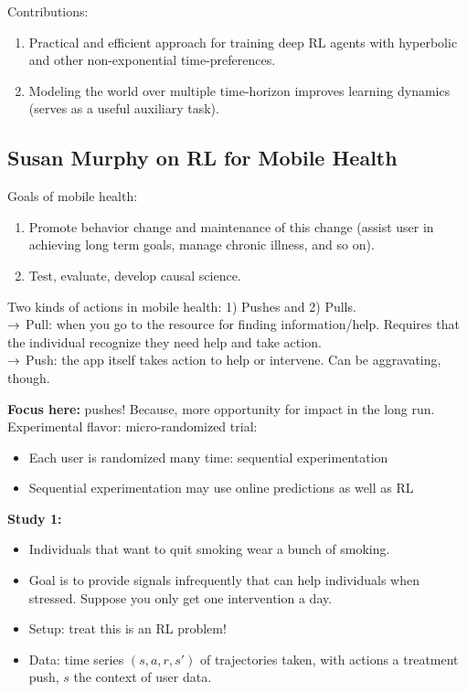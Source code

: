 Contributions:
\begin{enumerate}
    \item Practical and efficient approach for training deep RL agents with hyperbolic and other non-exponential time-preferences.
    
    \item Modeling the world over multiple time-horizon improves learning dynamics (serves as a useful auxiliary task).
\end{enumerate}
 
 \spacerule
 
 \subsection{Susan Murphy on RL for Mobile Health}

Goals of mobile health:
\begin{enumerate}
    \item Promote behavior change and maintenance of this change (assist user in achieving long term goals, manage chronic illness, and so on).
    \item Test, evaluate, develop causal science.
\end{enumerate}

Two kinds of actions in mobile health: 1) Pushes and 2) Pulls. \\

$\rightarrow$ Pull: when you go to the resource for finding information/help.  Requires that the individual recognize they need help and take action. \\

$\rightarrow$ Push: the app itself takes action to help or intervene. Can be aggravating, though.

{\bf Focus here:} pushes! Because, more opportunity for impact in the long run. \\

Experimental flavor: micro-randomized trial:
\begin{itemize}
    \item Each user is randomized many time: sequential experimentation
    \item Sequential experimentation may use online predictions as well as RL
\end{itemize}


{\bf Study 1:}
\begin{itemize}
    \item Individuals that want to quit smoking wear a bunch of smoking.
    \item Goal is to provide signals infrequently that can help individuals when stressed. Suppose you only get one intervention a day.
    \item Setup: treat this is an RL problem!
    \item Data: time series $(s,a,r,s')$ of trajectories taken, with actions a treatment push, $s$ the context of user data.
\end{itemize}


